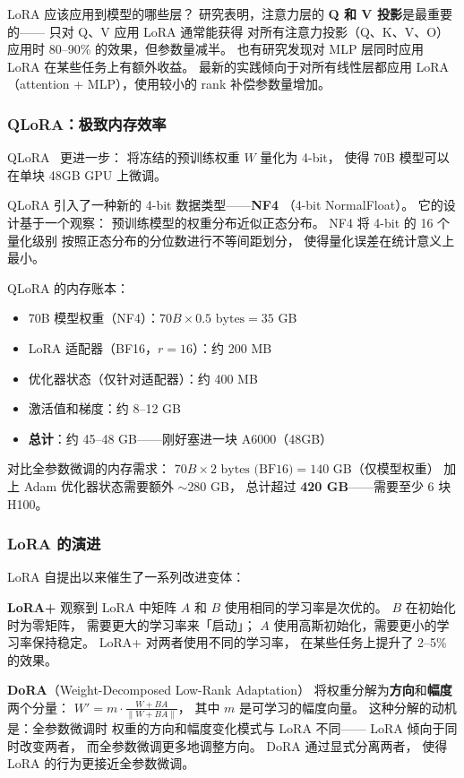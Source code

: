 LoRA 应该应用到模型的哪些层？
研究表明，注意力层的 \textbf{Q 和 V 投影}是最重要的——
只对 Q、V 应用 LoRA 通常能获得
对所有注意力投影（Q、K、V、O）应用时
80--90\% 的效果，但参数量减半。
也有研究发现对 MLP 层同时应用 LoRA
在某些任务上有额外收益。
最新的实践倾向于对所有线性层都应用 LoRA
（attention + MLP），使用较小的 rank 补偿参数量增加。

\subsubsection{QLoRA：极致内存效率}

QLoRA~\cite{dettmers2023qlora} 更进一步：
将冻结的预训练权重 $W$ 量化为 4-bit，
使得 70B 模型可以在单块 48GB GPU 上微调。

QLoRA 引入了一种新的 4-bit 数据类型——\textbf{NF4}
（4-bit NormalFloat）。
它的设计基于一个观察：
预训练模型的权重分布近似正态分布。
NF4 将 4-bit 的 16 个量化级别
按照正态分布的分位数进行不等间距划分，
使得量化误差在统计意义上最小。

QLoRA 的内存账本：
\begin{itemize}[noitemsep]
  \item 70B 模型权重（NF4）：$70B \times 0.5 \text{ bytes} = 35$ GB
  \item LoRA 适配器（BF16，$r=16$）：约 200 MB
  \item 优化器状态（仅针对适配器）：约 400 MB
  \item 激活值和梯度：约 8--12 GB
  \item \textbf{总计}：约 45--48 GB——刚好塞进一块 A6000（48GB）
\end{itemize}

对比全参数微调的内存需求：
$70B \times 2 \text{ bytes (BF16)} = 140$ GB（仅模型权重）
加上 Adam 优化器状态需要额外 $\sim$280 GB，
总计超过 \textbf{420 GB}——需要至少 6 块 H100。

\subsubsection{LoRA 的演进}

LoRA 自提出以来催生了一系列改进变体：

\textbf{LoRA+} 观察到 LoRA 中矩阵 $A$ 和 $B$
使用相同的学习率是次优的。
$B$ 在初始化时为零矩阵，
需要更大的学习率来「启动」；
$A$ 使用高斯初始化，需要更小的学习率保持稳定。
LoRA+ 对两者使用不同的学习率，
在某些任务上提升了 2--5\% 的效果。

\textbf{DoRA}（Weight-Decomposed Low-Rank Adaptation）
将权重分解为\textbf{方向}和\textbf{幅度}两个分量：
$W' = m \cdot \frac{W + BA}{\|W + BA\|}$，
其中 $m$ 是可学习的幅度向量。
这种分解的动机是：全参数微调时
权重的方向和幅度变化模式与 LoRA 不同——
LoRA 倾向于同时改变两者，
而全参数微调更多地调整方向。
DoRA 通过显式分离两者，
使得 LoRA 的行为更接近全参数微调。

